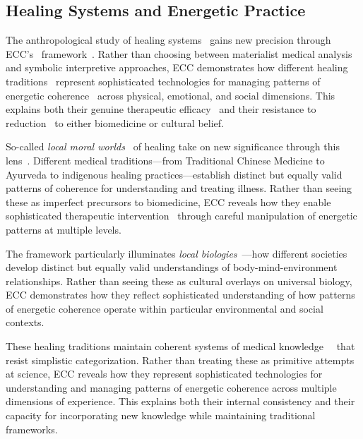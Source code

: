 \subsection*{Healing Systems and Energetic Practice}

The anthropological study of healing systems~ gains new precision through ECC's~ framework~\cite{csordas1993somatic,csordas2002body}. Rather than choosing between materialist medical analysis and symbolic interpretive approaches, ECC demonstrates how different healing traditions~ represent sophisticated technologies for managing patterns of energetic coherence~ across physical, emotional, and social dimensions. This explains both their genuine therapeutic efficacy~ and their resistance to reduction~ to either biomedicine or cultural belief.

So-called \textit{local moral worlds}~ of healing take on new significance through this lens~\cite{kleinman1980patients,good1994medicine}. Different medical traditions—from Traditional Chinese Medicine to Ayurveda to indigenous healing practices—establish distinct but equally valid patterns of coherence for understanding and treating illness. Rather than seeing these as imperfect precursors to biomedicine, ECC reveals how they enable sophisticated therapeutic intervention~ through careful manipulation of energetic patterns at multiple levels.

The framework particularly illuminates \textit{local biologies}~\cite{lock1993encounters,ernst2002plural}—how different societies develop distinct but equally valid understandings of body-mind-environment relationships. Rather than seeing these as cultural overlays on universal biology, ECC demonstrates how they reflect sophisticated understanding of how patterns of energetic coherence operate within particular environmental and social contexts.

These healing traditions maintain coherent systems of medical knowledge~~\cite{leslie1976asian,farquhar1994knowing} that resist simplistic categorization. Rather than treating these as primitive attempts at science, ECC reveals how they represent sophisticated technologies for understanding and managing patterns of energetic coherence across multiple dimensions of experience. This explains both their internal consistency and their capacity for incorporating new knowledge while maintaining traditional frameworks.


